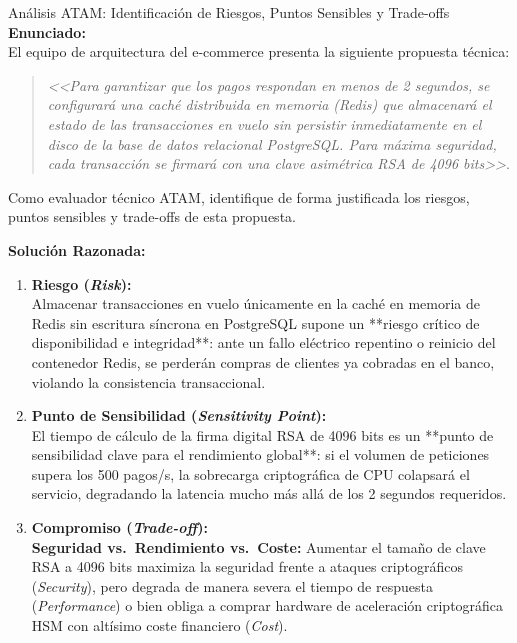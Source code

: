 \begin{ejercicioresuelto}{Análisis ATAM: Identificación de Riesgos, Puntos Sensibles y Trade-offs}
\textbf{Enunciado:}\\
El equipo de arquitectura del e-commerce presenta la siguiente propuesta técnica:
\begin{quote}
\emph{<<Para garantizar que los pagos respondan en menos de 2 segundos, se configurará una caché distribuida en memoria (Redis) que almacenará el estado de las transacciones en vuelo sin persistir inmediatamente en el disco de la base de datos relacional PostgreSQL. Para máxima seguridad, cada transacción se firmará con una clave asimétrica RSA de 4096 bits>>}.
\end{quote}
Como evaluador técnico ATAM, identifique de forma justificada los riesgos, puntos sensibles y trade-offs de esta propuesta.

\vspace{0.5em}
\textbf{Solución Razonada:}

\begin{enumerate}[leftmargin=1.5em]
  \item \textbf{Riesgo (\emph{Risk}):}\\
  Almacenar transacciones en vuelo únicamente en la caché en memoria de Redis sin escritura síncrona en PostgreSQL supone un **riesgo crítico de disponibilidad e integridad**: ante un fallo eléctrico repentino o reinicio del contenedor Redis, se perderán compras de clientes ya cobradas en el banco, violando la consistencia transaccional.
  \item \textbf{Punto de Sensibilidad (\emph{Sensitivity Point}):}\\
  El tiempo de cálculo de la firma digital RSA de 4096 bits es un **punto de sensibilidad clave para el rendimiento global**: si el volumen de peticiones supera los 500 pagos/s, la sobrecarga criptográfica de CPU colapsará el servicio, degradando la latencia mucho más allá de los 2 segundos requeridos.
  \item \textbf{Compromiso (\emph{Trade-off}):}\\
  \textbf{Seguridad vs.\ Rendimiento vs.\ Coste:} Aumentar el tamaño de clave RSA a 4096 bits maximiza la seguridad frente a ataques criptográficos (\emph{Security}), pero degrada de manera severa el tiempo de respuesta (\emph{Performance}) o bien obliga a comprar hardware de aceleración criptográfica HSM con altísimo coste financiero (\emph{Cost}).
\end{enumerate}
\end{ejercicioresuelto}

